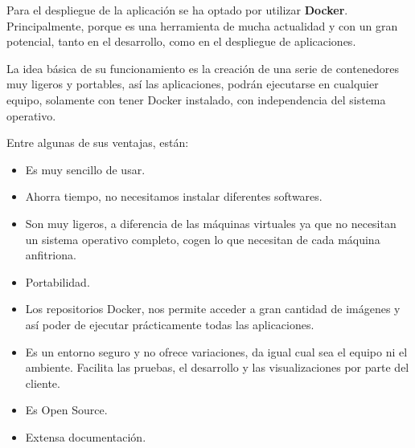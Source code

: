 Para el despliegue de la aplicación se ha optado por utilizar \textbf{Docker}. Principalmente, porque es una herramienta de mucha actualidad y con un gran potencial, tanto en el desarrollo, como en el despliegue de aplicaciones.

La idea básica de su funcionamiento es la creación de una serie de contenedores muy ligeros y portables, así las aplicaciones, podrán ejecutarse en cualquier equipo, solamente con tener Docker instalado, con independencia del sistema operativo.

Entre algunas de sus ventajas, están:

\begin{itemize}
\item Es muy sencillo de usar.
\item Ahorra tiempo, no necesitamos instalar diferentes softwares.
\item Son muy ligeros, a diferencia de las máquinas virtuales ya que no necesitan un sistema operativo completo, cogen lo que necesitan de cada máquina anfitriona.
\item Portabilidad.
\item Los repositorios Docker, nos permite acceder a gran cantidad de imágenes y así poder de ejecutar prácticamente todas las aplicaciones.
\item Es un entorno seguro y no ofrece variaciones, da igual cual sea el equipo ni el ambiente. Facilita las pruebas, el desarrollo y las visualizaciones por parte del cliente.
\item Es Open Source.
\item Extensa documentación.
\end{itemize}
